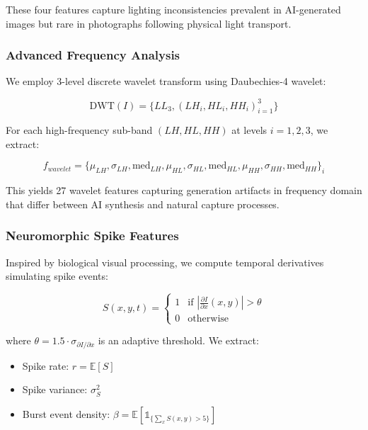 \documentclass[runningheads]{llncs}
\begin{document}
These four features capture lighting inconsistencies prevalent in AI-generated images but rare in photographs following physical light transport.

\subsubsection{Advanced Frequency Analysis}

We employ 3-level discrete wavelet transform using Daubechies-4 wavelet:

\begin{equation}
    \text{DWT}(I) = \{LL_3, (LH_i, HL_i, HH_i)_{i=1}^{3}\}
\end{equation}

For each high-frequency sub-band $(LH, HL, HH)$ at levels $i=1,2,3$, we extract:

\begin{equation}
    f_{wavelet} = \{\mu_{LH}, \sigma_{LH}, \text{med}_{LH}, \mu_{HL}, \sigma_{HL}, \text{med}_{HL}, \mu_{HH}, \sigma_{HH}, \text{med}_{HH}\}_i
\end{equation}

This yields 27 wavelet features capturing generation artifacts in frequency domain that differ between AI synthesis and natural capture processes.

\subsubsection{Neuromorphic Spike Features}

Inspired by biological visual processing, we compute temporal derivatives simulating spike events:

\begin{equation}
    S(x, y, t) = \begin{cases}
        1 & \text{if } |\frac{\partial I}{\partial x}(x,y)| > \theta \\
        0 & \text{otherwise}
    \end{cases}
\end{equation}

where $\theta = 1.5 \cdot \sigma_{\partial I/\partial x}$ is an adaptive threshold. We extract:

\begin{itemize}
    \item Spike rate: $r = \mathbb{E}[S]$
    \item Spike variance: $\sigma_S^2$
    \item Burst event density: $\beta = \mathbb{E}[\mathbb{1}_{\{\sum_x S(x,y) > 5\}}]$
\end{itemize}
\end{document}
